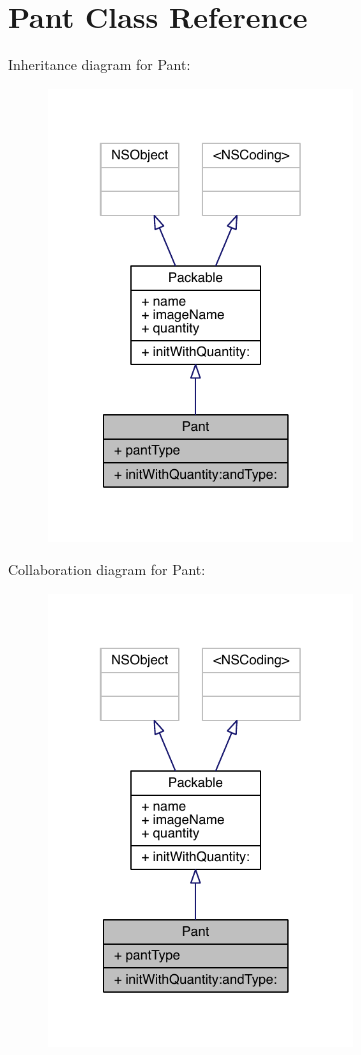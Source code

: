 \hypertarget{interface_pant}{\section{Pant Class Reference}
\label{interface_pant}
}


Inheritance diagram for Pant\-:\nopagebreak
\begin{figure}[H]
\begin{center}
\leavevmode
\includegraphics[width=229pt]{interface_pant__inherit__graph}
\end{center}
\end{figure}


Collaboration diagram for Pant\-:\nopagebreak
\begin{figure}[H]
\begin{center}
\leavevmode
\includegraphics[width=229pt]{interface_pant__coll__graph}
\end{center}
\end{figure}
